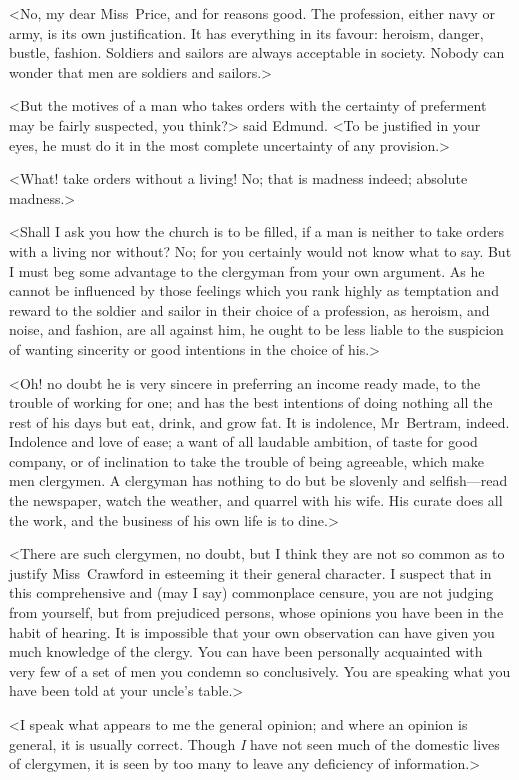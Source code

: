<No, my dear Miss~Price, and for reasons good. The profession, either navy or army, is its own justification. It has everything in its favour: heroism, danger, bustle, fashion. Soldiers and sailors are always acceptable in society. Nobody can wonder that men are soldiers and sailors.>

<But the motives of a man who takes orders with the certainty of preferment may be fairly suspected, you think?> said Edmund. <To be justified in your eyes, he must do it in the most complete uncertainty of any provision.>

<What! take orders without a living! No; that is madness indeed; absolute madness.>

<Shall I ask you how the church is to be filled, if a man is neither to take orders with a living nor without? No; for you certainly would not know what to say. But I must beg some advantage to the clergyman from your own argument. As he cannot be influenced by those feelings which you rank highly as temptation and reward to the soldier and sailor in their choice of a profession, as heroism, and noise, and fashion, are all against him, he ought to be less liable to the suspicion of wanting sincerity or good intentions in the choice of his.>

<Oh! no doubt he is very sincere in preferring an income ready made, to the trouble of working for one; and has the best intentions of doing nothing all the rest of his days but eat, drink, and grow fat. It is indolence, Mr~Bertram, indeed. Indolence and love of ease; a want of all laudable ambition, of taste for good company, or of inclination to take the trouble of being agreeable, which make men clergymen. A clergyman has nothing to do but be slovenly and selfish—read the newspaper, watch the weather, and quarrel with his wife. His curate does all the work, and the business of his own life is to dine.>

<There are such clergymen, no doubt, but I think they are not so common as to justify Miss~Crawford in esteeming it their general character. I suspect that in this comprehensive and (may I say) commonplace censure, you are not judging from yourself, but from prejudiced persons, whose opinions you have been in the habit of hearing. It is impossible that your own observation can have given you much knowledge of the clergy. You can have been personally acquainted with very few of a set of men you condemn so conclusively. You are speaking what you have been told at your uncle's table.>

<I speak what appears to me the general opinion; and where an opinion is general, it is usually correct. Though \textit{I}  have not seen much of the domestic lives of clergymen, it is seen by too many to leave any deficiency of information.>

